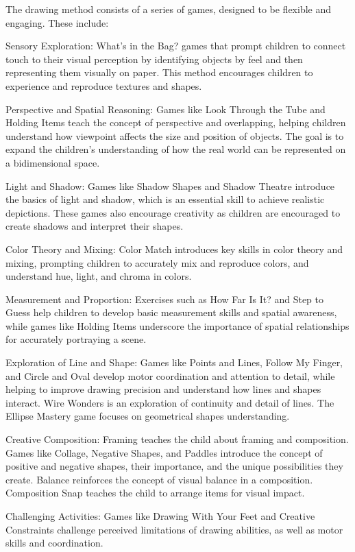 \documentclass{article}
\begin{document}
The drawing method consists of a series of games, designed to be flexible and engaging. These include:

Sensory Exploration: What's in the Bag? games that prompt children to connect touch to their visual perception by identifying objects by feel and then representing them visually on paper. This method encourages children to experience and reproduce textures and shapes.

Perspective and Spatial Reasoning: Games like Look Through the Tube and Holding Items teach the concept of perspective and overlapping, helping children understand how viewpoint affects the size and position of objects. The goal is to expand the children’s understanding of how the real world can be represented on a bidimensional space.

Light and Shadow: Games like Shadow Shapes and Shadow Theatre introduce the basics of light and shadow, which is an essential skill to achieve realistic depictions. These games also encourage creativity as children are encouraged to create shadows and interpret their shapes.

Color Theory and Mixing: Color Match introduces key skills in color theory and mixing, prompting children to accurately mix and reproduce colors, and understand hue, light, and chroma in colors.

Measurement and Proportion: Exercises such as How Far Is It? and Step to Guess help children to develop basic measurement skills and spatial awareness, while games like Holding Items underscore the importance of spatial relationships for accurately portraying a scene.

Exploration of Line and Shape: Games like Points and Lines, Follow My Finger, and Circle and Oval develop motor coordination and attention to detail, while helping to improve drawing precision and understand how lines and shapes interact. Wire Wonders is an exploration of continuity and detail of lines. The Ellipse Mastery game focuses on geometrical shapes understanding.

Creative Composition: Framing teaches the child about framing and composition. Games like Collage, Negative Shapes, and Paddles introduce the concept of positive and negative shapes, their importance, and the unique possibilities they create. Balance reinforces the concept of visual balance in a composition. Composition Snap teaches the child to arrange items for visual impact.

Challenging Activities: Games like Drawing With Your Feet and Creative Constraints challenge perceived limitations of drawing abilities, as well as motor skills and coordination.
\end{document}

